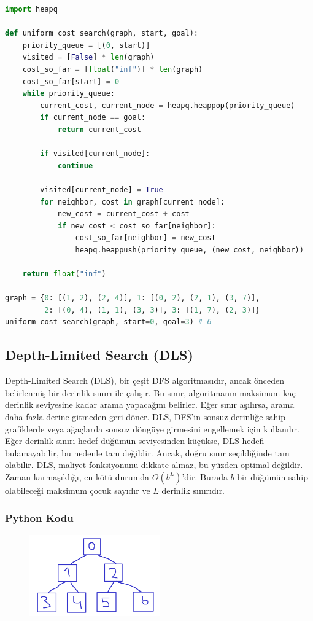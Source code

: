 \begin{lstlisting}[language=Python]
import heapq

def uniform_cost_search(graph, start, goal):
    priority_queue = [(0, start)]
    visited = [False] * len(graph)
    cost_so_far = [float("inf")] * len(graph)
    cost_so_far[start] = 0
    while priority_queue:
        current_cost, current_node = heapq.heappop(priority_queue)
        if current_node == goal:
            return current_cost

        if visited[current_node]:
            continue

        visited[current_node] = True
        for neighbor, cost in graph[current_node]:
            new_cost = current_cost + cost
            if new_cost < cost_so_far[neighbor]:
                cost_so_far[neighbor] = new_cost
                heapq.heappush(priority_queue, (new_cost, neighbor))

    return float("inf")

graph = {0: [(1, 2), (2, 4)], 1: [(0, 2), (2, 1), (3, 7)], 
         2: [(0, 4), (1, 1), (3, 3)], 3: [(1, 7), (2, 3)]}
uniform_cost_search(graph, start=0, goal=3) # 6
\end{lstlisting}

\newpage

\subsection{Depth-Limited Search (DLS)}

Depth-Limited Search (DLS), bir çeşit DFS algoritmasıdır, ancak önceden belirlenmiş bir derinlik sınırı ile çalışır. Bu sınır, algoritmanın maksimum kaç derinlik seviyesine kadar arama yapacağını belirler. Eğer sınır aşılırsa, arama daha fazla derine gitmeden geri döner. DLS, DFS'in sonsuz derinliğe sahip grafiklerde veya ağaçlarda sonsuz döngüye girmesini engellemek için kullanılır. Eğer derinlik sınırı hedef düğümün seviyesinden küçükse, DLS hedefi bulamayabilir, bu nedenle tam değildir. Ancak, doğru sınır seçildiğinde tam olabilir. DLS, maliyet fonksiyonunu dikkate almaz, bu yüzden optimal değildir. Zaman karmaşıklığı, en kötü durumda $O(b^L)$'dir. Burada $b$ bir düğümün sahip olabileceği maksimum çocuk sayıdır ve $L$ derinlik sınırıdır.

\subsubsection{Python Kodu}

\begin{figure}[h]
    \centering
    \includegraphics[width=0.5\textwidth]{images/dls.png}
    \caption{}
\end{figure}

